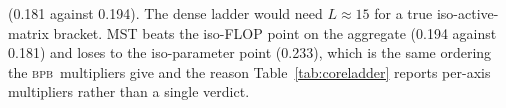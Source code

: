 \documentclass{article}
\newcommand{\bpb}{\textsc{bpb}}
\begin{document}
\begin{table}[t]
(0.181 against 0.194). The dense ladder would need $L\!\approx\!15$ for a true
iso-active-matrix bracket.
MST beats the iso-FLOP point on the aggregate (0.194 against 0.181) and loses to the
iso-parameter point (0.233), which is the same ordering the \bpb\ multipliers give and
the reason Table~\ref{tab:coreladder} reports per-axis multipliers rather than a single
verdict.
%
%
%
%
\end{table}
\end{document}
